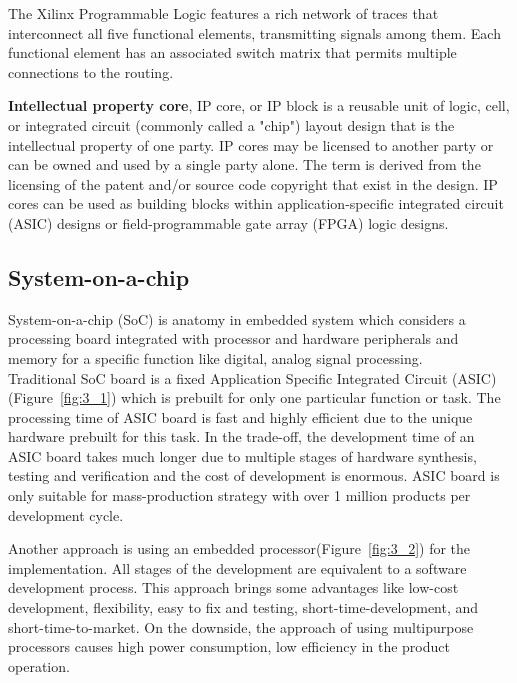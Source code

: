 \noindent The Xilinx Programmable Logic features a rich network of traces that interconnect all five functional elements, transmitting signals among them. Each functional element has an associated switch matrix that permits multiple connections to the routing\cite{spartan}. \\


\noindent \textbf{Intellectual property core}, IP core, or IP block is a reusable unit of logic, cell, or integrated circuit (commonly called a "chip") layout design that is the intellectual property of one party. IP cores may be licensed to another party or can be owned and used by a single party alone. The term is derived from the licensing of the patent and/or source code copyright that exist in the design. IP cores can be used as building blocks within application-specific integrated circuit (ASIC) designs or field-programmable gate array (FPGA) logic designs\cite{ipcore}.

\subsection{System-on-a-chip}

System-on-a-chip (SoC) is anatomy in embedded system which considers a processing board integrated with processor and hardware peripherals and memory for a specific function like digital, analog signal processing\cite{12457872420171101}. \\

\noindent Traditional SoC board is a fixed Application Specific Integrated Circuit (ASIC) (Figure~\ref{fig:3_1}) which is prebuilt for only one particular function or task. The processing time of ASIC board is fast and highly efficient due to the unique hardware prebuilt for this task. In the trade-off, the development time of an ASIC board takes much longer due to multiple stages of hardware synthesis, testing and verification and the cost of development is enormous. ASIC board is only suitable for mass-production strategy with over 1 million products per development cycle. \\


\noindent Another approach is using an embedded processor(Figure~\ref{fig:3_2}) for the implementation. All stages of the development are equivalent to a software development process. This approach brings some advantages like low-cost development, flexibility, easy to fix and testing, short-time-development, and short-time-to-market. On the downside, the approach of using multipurpose processors causes high power consumption, low efficiency in the product operation. \\

